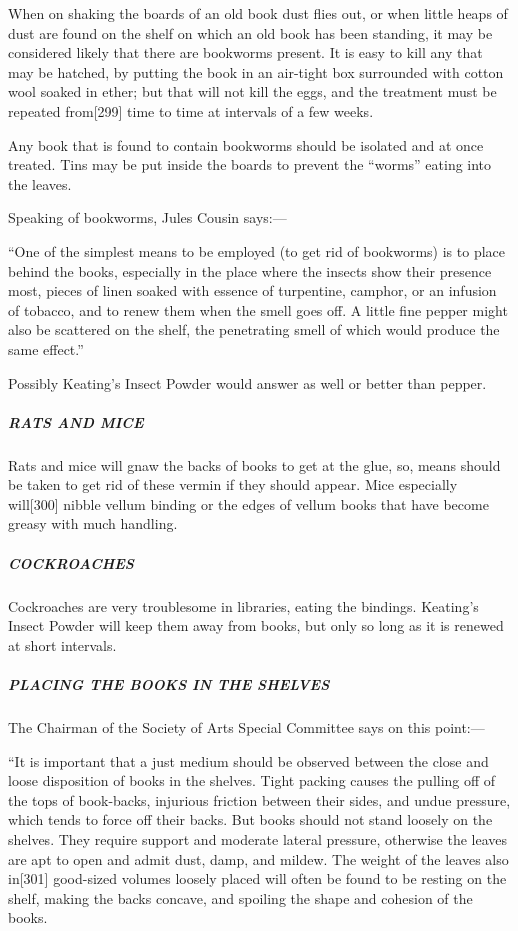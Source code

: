\documentclass[
]{article}
\begin{document}
When on shaking the boards of an old book dust flies out, or when little
heaps of dust are found on the shelf on which an old book has been
standing, it may be considered likely that there are bookworms present.
It is easy to kill any that may be hatched, by putting the book in an
air-tight box surrounded with cotton wool soaked in ether; but that will
not kill the eggs, and the treatment must be repeated
from{\protect\hypertarget{Page_299}{}{{[}299{]}}} time to time at
intervals of a few weeks.

Any book that is found to contain bookworms should be isolated and at
once treated. Tins may be put inside the boards to prevent the ``worms''
eating into the leaves.

Speaking of bookworms, Jules Cousin says:---

``One of the simplest means to be employed (to get rid of bookworms) is
to place behind the books, especially in the place where the insects
show their presence most, pieces of linen soaked with essence of
turpentine, camphor, or an infusion of tobacco, and to renew them when
the smell goes off. A little fine pepper might also be scattered on the
shelf, the penetrating smell of which would produce the same effect.''

Possibly Keating's Insect Powder would answer as well or better than
pepper.

\hypertarget{rats-and-mice}{%
\subparagraph{RATS AND MICE}\label{rats-and-mice}}

Rats and mice will gnaw the backs of books to get at the glue, so, means
should be taken to get rid of these vermin if they should appear. Mice
especially will{\protect\hypertarget{Page_300}{}{{[}300{]}}} nibble
vellum binding or the edges of vellum books that have become greasy with
much handling.

\hypertarget{cockroaches}{%
\subparagraph{COCKROACHES}\label{cockroaches}}

Cockroaches are very troublesome in libraries, eating the bindings.
Keating's Insect Powder will keep them away from books, but only so long
as it is renewed at short intervals.

\hypertarget{placing-the-books-in-the-shelves}{%
\subparagraph{PLACING THE BOOKS IN THE
SHELVES}\label{placing-the-books-in-the-shelves}}

The Chairman of the Society of Arts Special Committee says on this
point:---

``It is important that a just medium should be observed between the
close and loose disposition of books in the shelves. Tight packing
causes the pulling off of the tops of book-backs, injurious friction
between their sides, and undue pressure, which tends to force off their
backs. But books should not stand loosely on the shelves. They require
support and moderate lateral pressure, otherwise the leaves are apt to
open and admit dust, damp, and mildew. The weight of the leaves also
in{\protect\hypertarget{Page_301}{}{{[}301{]}}} good-sized volumes
loosely placed will often be found to be resting on the shelf, making
the backs concave, and spoiling the shape and cohesion of the books.
\end{document}
